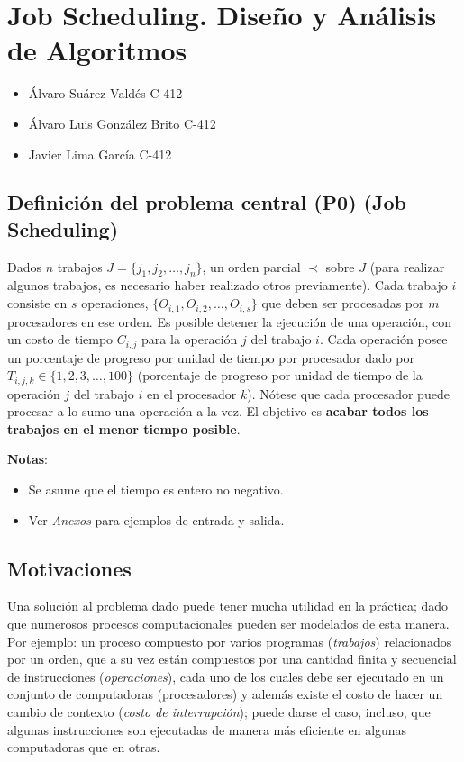 \documentclass[14pt]{extarticle}
\begin{document}
\section*{Job Scheduling. Diseño y Análisis de Algoritmos}

\begin{itemize}
    \item Álvaro Suárez Valdés C-412
    \item Álvaro Luis González Brito C-412
    \item Javier Lima García C-412
\end{itemize}

\subsection*{Definición del problema central (P0) (Job Scheduling)}

Dados $n$ trabajos $J = \{j_1, j_2, \ldots, j_n\}$, un orden parcial $\prec$ sobre $J$ (para realizar algunos trabajos, es necesario haber realizado otros previamente). Cada trabajo $i$ consiste en $s$ operaciones, $\{O_{i,1}, O_{i,2}, \ldots, O_{i,s}\}$ que deben ser procesadas por $m$ procesadores en ese orden. Es posible detener la ejecución de una operación, con un costo de tiempo $C_{i,j}$ para la operación $j$ del trabajo $i$. Cada operación posee un porcentaje de progreso por unidad de tiempo por procesador dado por $T_{i, j, k} \in \{1, 2, 3, \ldots, 100\}$ (porcentaje de progreso por unidad de tiempo de la operación $j$ del trabajo $i$ en el procesador $k$). Nótese que cada procesador puede procesar a lo sumo una operación a la vez. El objetivo es \textbf{acabar todos los trabajos en el menor tiempo posible}.

\textbf{Notas}:
\begin{itemize}
    \item Se asume que el tiempo es entero no negativo.
    \item Ver \textit{Anexos} para ejemplos de entrada y salida.
\end{itemize}

\subsection*{Motivaciones}

Una solución al problema dado puede tener mucha utilidad en la práctica; dado que numerosos procesos computacionales pueden ser modelados de esta manera. Por ejemplo: un proceso compuesto por varios programas (\textit{trabajos}) relacionados por un orden, que a su vez están compuestos por una cantidad finita y secuencial de instrucciones (\textit{operaciones}), cada uno de los cuales debe ser ejecutado en un conjunto de computadoras (procesadores) y además existe el costo de hacer un cambio de contexto (\textit{costo de interrupción}); puede darse el caso, incluso, que algunas instrucciones son ejecutadas de manera más eficiente en algunas computadoras que en otras.
\end{document}
